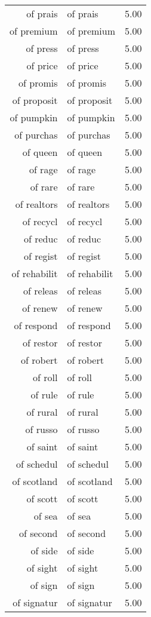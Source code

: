 \begin{table}[ht]
\begin{tabular}{rlr}
  of prais & of prais & 5.00 \\ 
  of premium & of premium & 5.00 \\ 
  of press & of press & 5.00 \\ 
  of price & of price & 5.00 \\ 
  of promis & of promis & 5.00 \\ 
  of proposit & of proposit & 5.00 \\ 
  of pumpkin & of pumpkin & 5.00 \\ 
  of purchas & of purchas & 5.00 \\ 
  of queen & of queen & 5.00 \\ 
  of rage & of rage & 5.00 \\ 
  of rare & of rare & 5.00 \\ 
  of realtors & of realtors & 5.00 \\ 
  of recycl & of recycl & 5.00 \\ 
  of reduc & of reduc & 5.00 \\ 
  of regist & of regist & 5.00 \\ 
  of rehabilit & of rehabilit & 5.00 \\ 
  of releas & of releas & 5.00 \\ 
  of renew & of renew & 5.00 \\ 
  of respond & of respond & 5.00 \\ 
  of restor & of restor & 5.00 \\ 
  of robert & of robert & 5.00 \\ 
  of roll & of roll & 5.00 \\ 
  of rule & of rule & 5.00 \\ 
  of rural & of rural & 5.00 \\ 
  of russo & of russo & 5.00 \\ 
  of saint & of saint & 5.00 \\ 
  of schedul & of schedul & 5.00 \\ 
  of scotland & of scotland & 5.00 \\ 
  of scott & of scott & 5.00 \\ 
  of sea & of sea & 5.00 \\ 
  of second & of second & 5.00 \\ 
  of side & of side & 5.00 \\ 
  of sight & of sight & 5.00 \\ 
  of sign & of sign & 5.00 \\ 
  of signatur & of signatur & 5.00 \\ 

\end{tabular}
\end{table}
